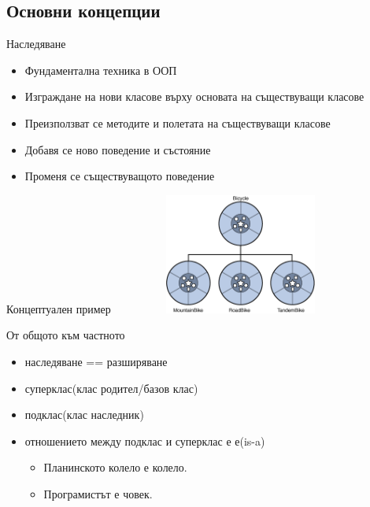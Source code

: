\documentclass{beamer}
\begin{document}
\subsection{Основни концепции}
\begin{frame}{Наследяване}
  \transdissolve
  \begin{itemize}
  \item Фундаментална техника в ООП \pause
  \item Изграждане на нови класове върху основата на съществуващи
    класове \pause
  \item Преизползват се методите и полетата на съществуващи класове \pause
  \item Добавя се ново поведение и състояние \pause
  \item Променя се съществуващото поведение
  \end{itemize}
\end{frame}

\begin{frame}{Концептуален пример}
  \transdissolve
  \includegraphics[width=320px, height=150px]{images/concepts-inheritance.png}  
\end{frame}

\begin{frame}{От общото към частното}
  \transdissolve
  \begin{itemize}
  \item наследяване == разширяване \pause
  \item суперклас(клас родител/базов клас) \pause
  \item подклас(клас наследник) \pause
  \item отношението между подклас и суперклас е е(is-a)
    \begin{itemize}
      \item Планинското колело е колело.
      \item Програмистът е човек.
    \end{itemize}
  \end{itemize}
\end{frame}
\end{document}
